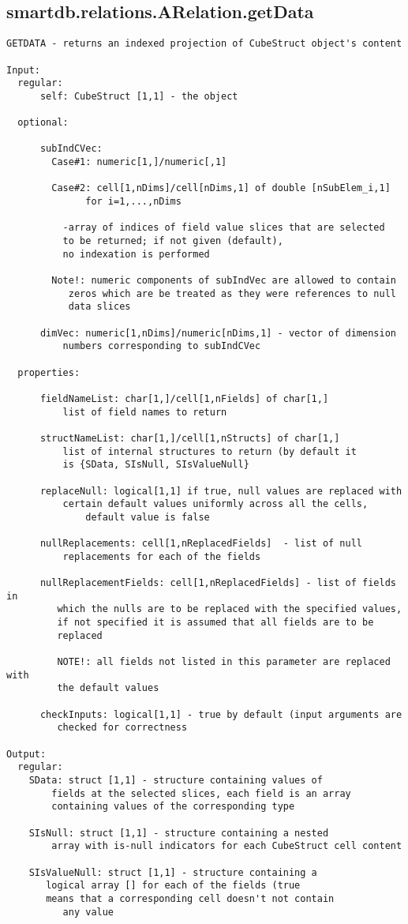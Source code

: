 \subsection{\texorpdfstring{smartdb.relations.ARelation.getData}{getData}}\label{method:smartdb.relations.ARelation.getData}
\begin{verbatim}
GETDATA - returns an indexed projection of CubeStruct object's content

Input:
  regular:
      self: CubeStruct [1,1] - the object

  optional:

      subIndCVec:
        Case#1: numeric[1,]/numeric[,1]

        Case#2: cell[1,nDims]/cell[nDims,1] of double [nSubElem_i,1]
              for i=1,...,nDims

          -array of indices of field value slices that are selected
          to be returned; if not given (default),
          no indexation is performed

        Note!: numeric components of subIndVec are allowed to contain
           zeros which are be treated as they were references to null
           data slices

      dimVec: numeric[1,nDims]/numeric[nDims,1] - vector of dimension
          numbers corresponding to subIndCVec

  properties:

      fieldNameList: char[1,]/cell[1,nFields] of char[1,]
          list of field names to return

      structNameList: char[1,]/cell[1,nStructs] of char[1,]
          list of internal structures to return (by default it
          is {SData, SIsNull, SIsValueNull}

      replaceNull: logical[1,1] if true, null values are replaced with
          certain default values uniformly across all the cells,
              default value is false

      nullReplacements: cell[1,nReplacedFields]  - list of null
          replacements for each of the fields

      nullReplacementFields: cell[1,nReplacedFields] - list of fields in
         which the nulls are to be replaced with the specified values,
         if not specified it is assumed that all fields are to be
         replaced

         NOTE!: all fields not listed in this parameter are replaced with
         the default values

      checkInputs: logical[1,1] - true by default (input arguments are
         checked for correctness

Output:
  regular:
    SData: struct [1,1] - structure containing values of
        fields at the selected slices, each field is an array
        containing values of the corresponding type

    SIsNull: struct [1,1] - structure containing a nested
        array with is-null indicators for each CubeStruct cell content

    SIsValueNull: struct [1,1] - structure containing a
       logical array [] for each of the fields (true
       means that a corresponding cell doesn't not contain
          any value
\end{verbatim}
